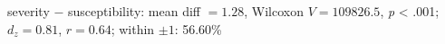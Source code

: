 severity $-$ susceptibility: mean diff $=1.28$, Wilcoxon $V=109826.5$, \textit{p} < .001; $d_z=0.81$, $r=0.64$; within $\pm 1$: 56.60\%%
